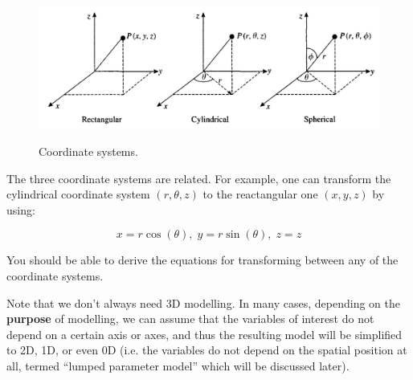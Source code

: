 \documentclass[a4paper,11pt]{article}
\theoremstyle{definition}
\begin{document}
\begin{figure} [!h]
 \begin{center}
	\includegraphics[width=.6\textwidth]{coord}\\
 \end{center}
 \caption{Coordinate systems.} 
 \label{fig:coord}
\end{figure}

The three coordinate systems are related. For example, one can transform the cylindrical coordinate system $(r, \theta, z)$
to the reactangular one $(x, y, z)$ by using:

\begin{equation}
	x = r \cos(\theta), \; 
	y = r \sin(\theta), \;
	z = z
\end{equation}

\noindent You should be able to derive the equations for transforming between any of the coordinate systems.

Note that we don't always need 3D modelling. In many cases, depending on the \textbf{purpose} of modelling, we can assume
that the variables of interest do not depend on a certain axis or axes, and thus the resulting model will be simplified to
2D, 1D, or even 0D (i.e. the variables do not depend on the spatial position at all, termed ``lumped parameter model'' which will be discussed later).
\end{document}

